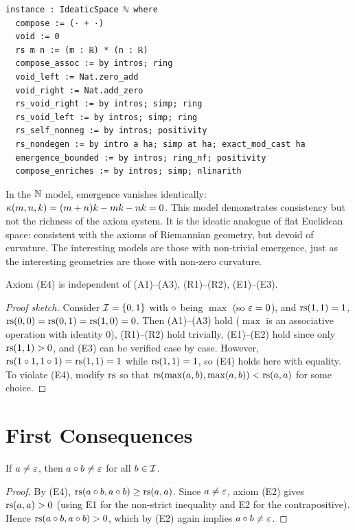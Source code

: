 \begin{lstlisting}[language=Lean4, caption={The natural number model in
Lean 4}]
instance : IdeaticSpace ℕ where
  compose := (· + ·)
  void := 0
  rs m n := (m : ℝ) * (n : ℝ)
  compose_assoc := by intros; ring
  void_left := Nat.zero_add
  void_right := Nat.add_zero
  rs_void_right := by intros; simp; ring
  rs_void_left := by intros; simp; ring
  rs_self_nonneg := by intros; positivity
  rs_nondegen := by intro a ha; simp at ha; exact_mod_cast ha
  emergence_bounded := by intros; ring_nf; positivity
  compose_enriches := by intros; simp; nlinarith
\end{lstlisting}

\begin{remark}
In the $\mathbb{N}$ model, emergence vanishes identically: $\kappa(m,n,k) =
(m+n)k - mk - nk = 0$. This model demonstrates consistency but not the
richness of the axiom system. It is the ideatic analogue of flat
Euclidean space: consistent with the axioms of Riemannian geometry, but
devoid of curvature. The interesting models are those with non-trivial
emergence, just as the interesting geometries are those with non-zero
curvature.
\end{remark}

\begin{proposition}[Independence of E4]
Axiom (E4) is independent of (A1)--(A3), (R1)--(R2), (E1)--(E3).
\end{proposition}
\begin{proof}[Proof sketch]
Consider $\mathcal{I} = \{0, 1\}$ with $\circ$ being $\max$ (so $\varepsilon = 0$),
and $\mathrm{rs}(1,1) = 1$, $\mathrm{rs}(0,0) = \mathrm{rs}(0,1) = \mathrm{rs}(1,0) = 0$. Then (A1)--(A3)
hold ($\max$ is an associative operation with identity $0$), (R1)--(R2)
hold trivially, (E1)--(E2) hold since only $\mathrm{rs}(1,1)>0$, and (E3) can be
verified case by case. However, $\mathrm{rs}(1 \circ 1, 1 \circ 1) =
\mathrm{rs}(1,1) = 1$ while $\mathrm{rs}(1,1)=1$, so (E4) holds here with equality.
To violate (E4), modify $\mathrm{rs}$ so that $\mathrm{rs}(\max(a,b), \max(a,b)) <
\mathrm{rs}(a,a)$ for some choice.
\end{proof}

\section{First Consequences}

\begin{theorem}\label{thm:non-annihilation}
If $a \neq \varepsilon$, then $a \circ b \neq \varepsilon$ for all $b \in \mathcal{I}$.
\end{theorem}
\begin{proof}
By (E4), $\mathrm{rs}(a \circ b, a \circ b) \geq \mathrm{rs}(a, a)$. Since
$a \neq \varepsilon$, axiom (E2) gives $\mathrm{rs}(a,a) > 0$ (using E1 for the
non-strict inequality and E2 for the contrapositive). Hence
$\mathrm{rs}(a \circ b, a \circ b) > 0$, which by (E2) again implies
$a \circ b \neq \varepsilon$.
\end{proof}

